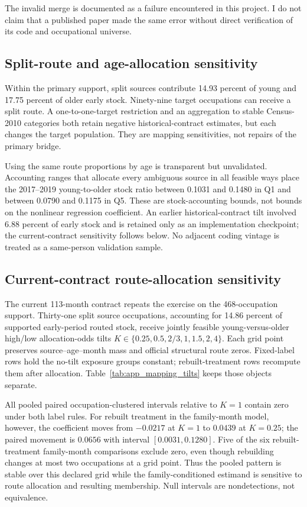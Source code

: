 The invalid merge is documented as a failure encountered in this project.  I do not claim that a published paper made the same error without direct verification of its code and occupational universe.

\subsection{Split-route and age-allocation sensitivity}

Within the primary support, split sources contribute 14.93 percent of young and 17.75 percent of older early stock.  Ninety-nine target occupations can receive a split route.  A one-to-one-target restriction and an aggregation to stable Census-2010 categories both retain negative historical-contract estimates, but each changes the target population.  They are mapping sensitivities, not repairs of the primary bridge.

Using the same route proportions by age is transparent but unvalidated.  Accounting ranges that allocate every ambiguous source in all feasible ways place the 2017--2019 young-to-older stock ratio between 0.1031 and 0.1480 in Q1 and between 0.0790 and 0.1175 in Q5.  These are stock-accounting bounds, not bounds on the nonlinear regression coefficient.  An earlier historical-contract tilt involved 6.88 percent of early stock and is retained only as an implementation checkpoint; the current-contract sensitivity follows below.  No adjacent coding vintage is treated as a same-person validation sample.

\subsection{Current-contract route-allocation sensitivity}

The current 113-month contract repeats the exercise on the 468-occupation
support.  Thirty-one split source occupations, accounting for 14.86 percent of
supported early-period routed stock, receive jointly feasible young-versus-older
high/low allocation-odds tilts $K\in\{0.25,0.5,2/3,1,1.5,2,4\}$.  Each grid
point preserves source--age--month mass and official structural route zeros.
Fixed-label rows hold the no-tilt exposure groups constant; rebuilt-treatment
rows recompute them after allocation.  Table~\ref{tab:app_mapping_tilts} keeps
those objects separate.



All pooled paired occupation-clustered intervals relative to $K=1$ contain
zero under both label rules.  For rebuilt treatment in the family-month model,
however, the coefficient moves from $-0.0217$ at $K=1$ to $0.0439$ at
$K=0.25$; the paired movement is $0.0656$ with interval
$[0.0031,0.1280]$.  Five of the six rebuilt-treatment family-month comparisons
exclude zero, even though rebuilding changes at most two occupations at a grid
point.  Thus the pooled pattern is stable over this declared grid while the
family-conditioned estimand is sensitive to route allocation and resulting
membership.  Null intervals are nondetections, not equivalence.

